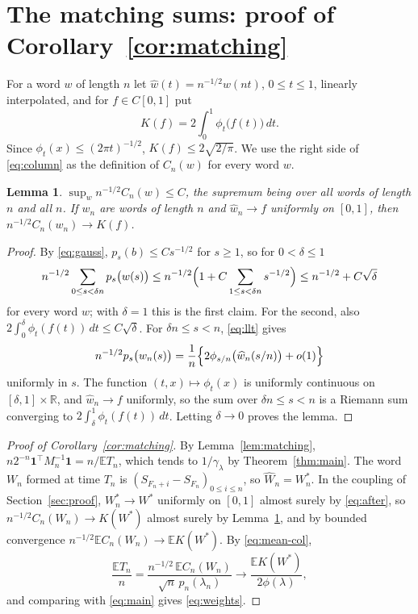 \documentclass[11pt]{amsart}
\newtheorem{lemma}[theorem]{Lemma}
\theoremstyle{remark}
\numberwithin{equation}{section}
\newcommand{\EE}{\mathbb{E}}
\newcommand{\R}{\mathbb{R}}
\newcommand{\one}{\mathbf 1}
\begin{document}
\section{The matching sums: proof of Corollary~\ref{cor:matching}}\label{sec:matching}

For a word $w$ of length $n$ let $\widehat w(t)=n^{-1/2}w(nt)$, $0\le t\le1$, linearly interpolated, and for $f\in C[0,1]$ put
\[
K(f)=2\int_0^1\phi_t\bigl(f(t)\bigr)\,dt .
\]
Since $\phi_t(x)\le(2\pi t)^{-1/2}$, $K(f)\le 2\sqrt{2/\pi}$. We use the right side of \eqref{eq:column} as the definition of $C_n(w)$ for every word $w$.

\begin{lemma}\label{lem:riemann}
$\sup_wn^{-1/2}C_n(w)\le C$, the supremum being over all words of length $n$ and all $n$. If $w_n$ are words of length $n$ and $\widehat w_n\to f$ uniformly on $[0,1]$, then $n^{-1/2}C_n(w_n)\to K(f)$.
\end{lemma}

\begin{proof}
By \eqref{eq:gauss}, $p_s(b)\le Cs^{-1/2}$ for $s\ge1$, so for $0<\delta\le1$
\begin{equation}\label{eq:small}
n^{-1/2}\sum_{0\le s<\delta n}p_s\bigl(w(s)\bigr)\le n^{-1/2}\Bigl(1+C\sum_{1\le s<\delta n}s^{-1/2}\Bigr)\le n^{-1/2}+C\sqrt\delta
\end{equation}
for every word $w$; with $\delta=1$ this is the first claim. For the second, also $2\int_0^\delta\phi_t(f(t))\,dt\le C\sqrt\delta$. For $\delta n\le s<n$, \eqref{eq:llt} gives
\[
n^{-1/2}p_s\bigl(w_n(s)\bigr)=\frac1n\Bigl\{2\phi_{s/n}\bigl(\widehat w_n(s/n)\bigr)+o(1)\Bigr\}
\]
uniformly in $s$. The function $(t,x)\mapsto\phi_t(x)$ is uniformly continuous on $[\delta,1]\times\R$, and $\widehat w_n\to f$ uniformly, so the sum over $\delta n\le s<n$ is a Riemann sum converging to $2\int_\delta^1\phi_t(f(t))\,dt$. Letting $\delta\to0$ proves the lemma.
\end{proof}

\begin{proof}[Proof of Corollary~\ref{cor:matching}]
By Lemma~\ref{lem:matching}, $n2^{-n}\one^\top M_n^{-1}\one=n/\EE T_n$, which tends to $1/\gamma_\lambda$ by Theorem~\ref{thm:main}. The word $W_n$ formed at time $T_n$ is $(S_{F_n+i}-S_{F_n})_{0\le i\le n}$, so $\widehat W_n=W_n^*$. In the coupling of Section~\ref{sec:proof}, $W_n^*\to W^*$ uniformly on $[0,1]$ almost surely by \eqref{eq:after}, so $n^{-1/2}C_n(W_n)\to K(W^*)$ almost surely by Lemma~\ref{lem:riemann}, and by bounded convergence $n^{-1/2}\EE C_n(W_n)\to\EE K(W^*)$. By \eqref{eq:mean-col},
\[
\frac{\EE T_n}n=\frac{n^{-1/2}\,\EE C_n(W_n)}{\sqrt n\,p_n(\lambda_n)}\to\frac{\EE K(W^*)}{2\phi(\lambda)},
\]
and comparing with \eqref{eq:main} gives \eqref{eq:weights}.
\end{proof}
\end{document}
